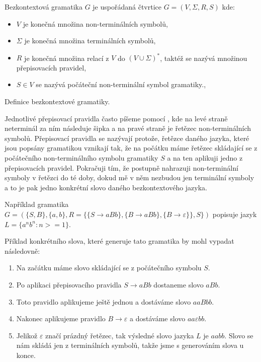\begin{framed}
	Bezkontextová gramatika \( G \) je uspořádaná čtvrtice \( G = (V, \Sigma, R, S) \) kde:
	\begin{itemize}
		\item \( V \) je konečná množina non-terminálních symbolů,
		\item \( \Sigma \) je konečná množina terminálních symbolů,
		\item \( R \) je konečná množina relací z \(V\) do \( (V \cup \Sigma )^* \), taktéž se nazývá množinou přepisovacích pravidel,
		\item \( S \in V\) se nazývá počáteční non-terminální symbol gramatiky.,
	\end{itemize}
\end{framed}
\begin{mydef}
	Definice bezkontextové gramatiky.
\end{mydef}
Jednotlivé přepisovací pravidla často píšeme pomocí , kde na levé straně neterminál za ním následuje šipka a na pravé straně je řetězec non-terminálních symbolů. Přepisovací pravidla se nazývají protože, řetězce daného jazyka, které jsou popsány gramatikou vznikají tak, že na počátku máme řetězec skládající se z počátečního non-terminálního symbolu gramatiky \(S\) a na ten aplikuji jedno z přepisovacích pravidel. Pokračuji tím, že postupně nahrazuji non-terminální symboly v řetězci do té doby, dokud mě v něm nezbudou jen terminální symboly a to je pak jedno konkrétní slovo daného bezkontextového jazyka.

Například gramatika \( G = (\{S, B\}, \{ a, b\}, R = \{\{S \rightarrow aBb\}, \{B \rightarrow aBb\},\{B \rightarrow \varepsilon\}\}, S \}) \) popisuje jazyk \( L = \{ a^n b^n : n >= 1 \}  \).

Příklad konkrétního slova, které generuje tato gramatika by mohl vypadat následovně:
\begin{enumerate}
	\item Na začátku máme slovo skládající se z počátečního symbolu \(S\).
	\item Po aplikaci přepisovacího pravidla \(S \rightarrow aBb\) dostaneme slovo \(aBb\).
	\item Toto pravidlo aplikujeme ještě jednou a dostáváme slovo \(aaBbb\).
	\item Nakonec aplikujeme pravidlo \(B \rightarrow \varepsilon \) a dostáváme slovo \(aa\varepsilon bb\).
	\item Jelikož \(\varepsilon\) značí prázdný řetězec, tak výsledné slovo jazyka \(L\) je \(aabb\). Slovo se nám skládá jen z terminálních symbolů, takže jsme s generováním slova u konce.
\end{enumerate}
\cite{CFG}

